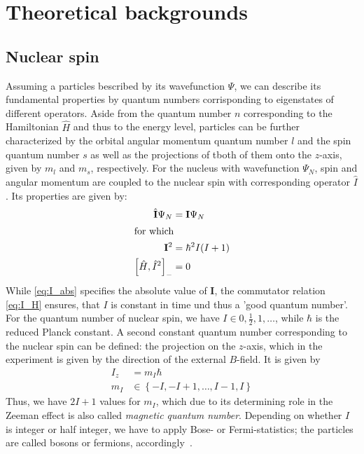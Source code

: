 \section{Theoretical backgrounds}
\subsection{Nuclear spin}
Assuming a particles bescribed by its wavefunction $\Psi$, we can describe 
its fundamental properties by quantum numbers corrisponding to eigenstates
of different operators. Aside from the quantum number $n$ corresponding to the 
Hamiltonian $\hat{H}$ and thus to the energy level, particles can be further characterized 
by the orbital angular momentum quantum number $l$ and the spin quantum number 
$s$ as well as the projections of tboth of them onto the $z$-axis, given by 
$m_l$ and $m_s$, respectively. For the nucleus with wavefunction $\Psi_N$, 
spin and angular momentum are coupled to the 
nuclear spin with corresponding operator $\hat{I}$. Its properties are given by:
\begin{align}
    \hat{\mathbf{I}} \Psi_N &= \mathbf{I} \Psi_N \\ 
\intertext{for which}
    \mathbf{I}^2 &= \hbar^2 I(I + 1)
    \label{eq:I_abs}\\
    \left[\hat{H}, \hat{I}^2\right]_- &= 0 
    \label{eq:I_H}\\
\end{align}
While \eqref{eq:I_abs} specifies the absolute value of $\mathbf{I}$, the commutator relation 
\eqref{eq:I_H} ensures, that $I$ is constant in time und thus a 'good quantum number'.
For the quantum number of nuclear spin, we have $I \in {0, \frac{1}{2}, 1, \ldots}$, while $\hbar$ is the 
reduced Planck constant. A second constant quantum number corresponding to the nuclear spin can be defined:
the projection on the $z$-axis, which in the experiment is given by the direction of the external $B$-field.
It is given by
\begin{align}
    I_z &= m_I \hbar \\
    m_I &\in \left\{-I, -I + 1, \ldots, I - 1, I\right\}
\end{align}
Thus, we have $2I + 1$ values for $m_I$, which due to its determining role in the Zeeman effect is 
also called \emph{magnetic quantum number}. Depending on whether $I$ is integer or half integer, 
we have to apply Bose- or Fermi-statistics; the particles are called bosons or fermions, 
accordingly~\cite{Demtroeder1}.


